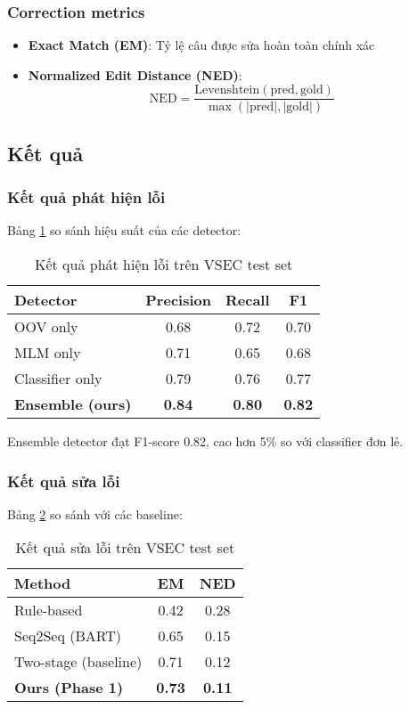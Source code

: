 \documentclass[conference]{IEEEtran}
\begin{document}
\subsubsection{Correction metrics}
\begin{itemize}
    \item \textbf{Exact Match (EM)}: Tỷ lệ câu được sửa hoàn toàn chính xác
    \item \textbf{Normalized Edit Distance (NED)}: 
    \begin{equation}
    \text{NED} = \frac{\text{Levenshtein}(\text{pred}, \text{gold})}{\max(|\text{pred}|, |\text{gold}|)}
    \end{equation}
\end{itemize}

\subsection{Kết quả}

\subsubsection{Kết quả phát hiện lỗi}
Bảng \ref{tab:detection} so sánh hiệu suất của các detector:

\begin{table}[htbp]
\caption{Kết quả phát hiện lỗi trên VSEC test set}
\label{tab:detection}
\centering
\begin{tabular}{|l|c|c|c|}
\hline
\textbf{Detector} & \textbf{Precision} & \textbf{Recall} & \textbf{F1} \\
\hline
OOV only & 0.68 & 0.72 & 0.70 \\
MLM only & 0.71 & 0.65 & 0.68 \\
Classifier only & 0.79 & 0.76 & 0.77 \\
\hline
\textbf{Ensemble (ours)} & \textbf{0.84} & \textbf{0.80} & \textbf{0.82} \\
\hline
\end{tabular}
\end{table}

Ensemble detector đạt F1-score 0.82, cao hơn 5\% so với classifier đơn lẻ.

\subsubsection{Kết quả sửa lỗi}
Bảng \ref{tab:correction} so sánh với các baseline:

\begin{table}[htbp]
\caption{Kết quả sửa lỗi trên VSEC test set}
\label{tab:correction}
\centering
\begin{tabular}{|l|c|c|}
\hline
\textbf{Method} & \textbf{EM} & \textbf{NED} \\
\hline
Rule-based & 0.42 & 0.28 \\
Seq2Seq (BART) & 0.65 & 0.15 \\
Two-stage (baseline) & 0.71 & 0.12 \\
\hline
\textbf{Ours (Phase 1)} & \textbf{0.73} & \textbf{0.11} \\
\hline
\end{tabular}
\end{table}
\end{document}
